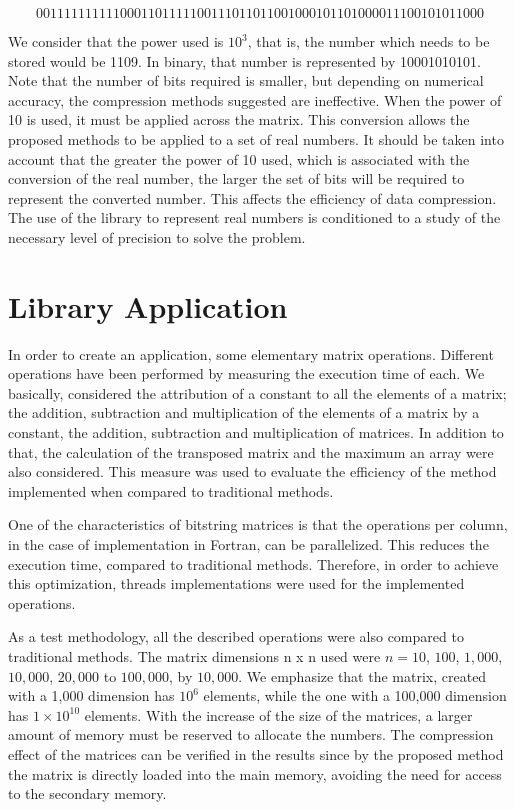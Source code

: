\documentclass[10pt]{article}
\begin{document}
\begin{equation}\nonumber
  0011111111110001101111100111011011001000101101000011100101011000
\end{equation}

We consider that the power used is $10^3$, that is, the number which needs to be 
stored would be 1109. In binary, that 
number is represented by 10001010101. Note that the number of bits required is 
smaller, but depending on numerical 
accuracy, the compression methods suggested are ineffective. When the power of 
10 is used, it must be applied across the 
matrix. This conversion allows the proposed methods to be applied to a set of 
real numbers. It should be taken into 
account that the greater the power of 10 used, which is associated with the 
conversion of the real number, the larger 
the set of bits will be required to represent the converted number. This affects 
the efficiency of data compression. The 
use of the library to represent real numbers is conditioned to a study of the 
necessary level of precision to solve the 
problem.

\section*{Library Application}

In order to create an application, some elementary matrix operations. Different 
operations have been performed by 
measuring the execution time of each. We basically, considered the attribution 
of a constant to all the elements of a 
matrix; the addition, subtraction and multiplication of the elements of a matrix 
by a constant, the addition, 
subtraction and multiplication of matrices. In addition to that, the calculation 
of  the transposed matrix and the 
maximum an array were also considered. This measure was used to evaluate the 
efficiency of the method implemented when 
compared to traditional methods.

One of the characteristics of bitstring matrices is that the operations per 
column, in the case of implementation in 
Fortran, can be parallelized. This reduces the execution time, compared to 
traditional methods. Therefore, in order to 
achieve this optimization, threads implementations were used for the implemented 
operations.

As a test methodology, all the described operations were also compared to 
traditional methods. The matrix dimensions n x 
n used were $n = 10$, $100$, $1,000$, $10,000$, $20,000$ to $100,000$, by 
$10,000$. We emphasize that the matrix,  
created with a 1,000 dimension has $10^6$ elements, while the one with a 100,000 
dimension has $1 \times 10^{10}$ 
elements. With the increase of the size of the matrices, a larger amount of 
memory must be reserved to allocate the 
numbers. The compression effect of the matrices can be verified in the results 
since by the proposed method the matrix 
is ​​directly loaded into the main memory, avoiding the need for access to the 
secondary memory.
\end{document}
